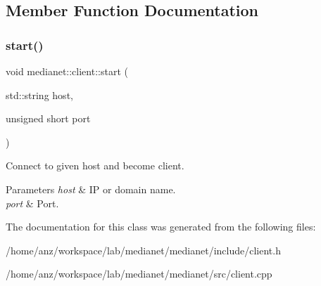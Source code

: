 \subsection{Member Function Documentation}
\mbox{\label{classmedianet_1_1client_a5700e0893f2771ab6ed5a2e119db35e7}} 
\subsubsection{\texorpdfstring{start()}{start()}}
{\footnotesize\ttfamily void medianet\+::client\+::start (\begin{DoxyParamCaption}\item[{std\+::string}]{host,  }\item[{unsigned short}]{port }\end{DoxyParamCaption})}



Connect to given host and become client. 


\begin{DoxyParams}{Parameters}
{\em host} & IP or domain name. \\
\hline
{\em port} & Port. \\
\hline
\end{DoxyParams}


The documentation for this class was generated from the following files\+:\begin{DoxyCompactItemize}
\item 
/home/anz/workspace/lab/medianet/medianet/include/client.\+h\item 
/home/anz/workspace/lab/medianet/medianet/src/client.\+cpp\end{DoxyCompactItemize}
